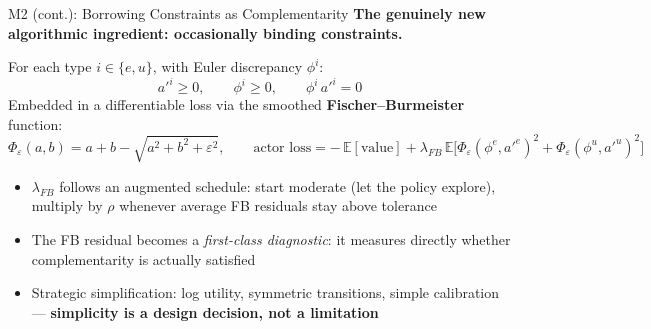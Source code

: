 \documentclass[10pt,aspectratio=169]{beamer}
\begin{document}
\begin{frame}[label=mainM2fb]{M2 (cont.): Borrowing Constraints as Complementarity}
\textbf{The genuinely new algorithmic ingredient: occasionally binding constraints.}

\smallskip
For each type $i \in \{e,u\}$, with Euler discrepancy $\phi^i$:
\[
a'^i \ge 0, \qquad \phi^i \ge 0, \qquad \phi^i \, a'^i = 0
\]
Embedded in a differentiable loss via the smoothed \textbf{Fischer--Burmeister} function:
\[
\Phi_\varepsilon(a,b) = a + b - \sqrt{a^2 + b^2 + \varepsilon^2}, \qquad
\text{actor loss} = -\,\mathbb{E}[\text{value}] + \lambda_{FB}\,\mathbb{E}\big[\Phi_\varepsilon(\phi^e, a'^e)^2 + \Phi_\varepsilon(\phi^u, a'^u)^2\big]
\]

\smallskip
\begin{itemize}
    \item $\lambda_{FB}$ follows an augmented schedule: start moderate (let the policy explore),
          multiply by $\rho$ whenever average FB residuals stay above tolerance
    \item The FB residual becomes a \emph{first-class diagnostic}: it measures directly whether
          complementarity is actually satisfied
    \item Strategic simplification: log utility, symmetric transitions, simple calibration ---
          \textbf{simplicity is a design decision, not a limitation}
\end{itemize}
\vspace{0.2em}\hfill\hyperlink{appHArec}{}
\end{frame}
\end{document}

